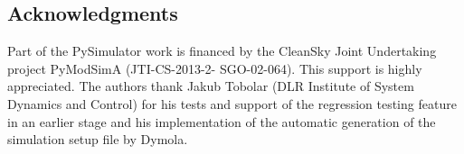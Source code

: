 \subsection*{Acknowledgments}
\label{sec:pythonacknowledgments}

Part of the PySimulator work is financed by the CleanSky Joint Undertaking project PyModSimA (JTI-CS-2013-2-
SGO-02-064). This support is highly appreciated. The authors thank Jakub Tobolar (DLR
Institute of System Dynamics and Control) for his tests and support of the regression testing feature in an
earlier stage and his implementation of the automatic generation of the simulation setup file by Dymola.





